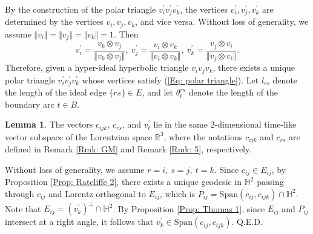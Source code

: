 \documentclass[12pt]{amsart}
\theoremstyle{definition}
\newtheorem{lemma}[theorem]{Lemma}
\def\qed{\hfill{Q.E.D.}\smallskip}
\begin{document}
By the construction of the polar triangle $v^\prime_iv^\prime_jv^\prime_k$,
the vertices $v^\prime_i, v^\prime_j, v^\prime_k$ are determined by the vertices $v_i, v_j, v_k$, and vice versa.
Without loss of generality, we assume $\Vert v_i\Vert =\Vert v_j\Vert =\Vert v_k\Vert =1$.
Then
\begin{equation}\label{Eq: polar triangle}
v^\prime_i=\frac{v_k\otimes v_j}{\Vert v_k\otimes v_j\Vert },\
v^\prime_j=\frac{v_i\otimes v_k}{\Vert v_i\otimes v_k\Vert },\
v^\prime_k=\frac{v_j\otimes v_i}{\Vert v_j\otimes v_i\Vert }.
\end{equation}
Therefore, given a hyper-ideal hyperbolic triangle $v_iv_jv_k$, there exists a unique polar triangle $v^\prime_iv^\prime_jv^\prime_k$ whose vertices satisfy (\ref{Eq: polar triangle}).
Let $l_{rs}$ denote the length of the ideal edge $\{rs\}\in E$, and let $\theta^{rs}_{t}$ denote the length of the boundary arc $t\in B$.

\begin{lemma}\label{Lem: coplaner}
The vectors $c_{ijk}$, $c_{rs}$, and $v^\prime_t$ lie in the same 2-dimensional time-like vector subspace of the Lorentzian space $\mathbb{R}^3$,
where the notations $c_{ijk}$ and $c_{rs}$ are defined in Remark \ref{Rmk: GM} and Remark \ref{Rmk: 5}, respectively. 
\end{lemma}
\proof
Without loss of generality, we assume $r=i,\ s=j,\ t=k$.
Since $c_{ij}\in E_{ij}$, by Proposition \ref{Prop: Ratcliffe 2},
there exists a unique geodesic in $\mathbb{H}^2$ passing through $c_{ij}$ and Lorentz orthogonal to $E_{ij}$, which is $P_{ij}=\textrm{Span}(c_{ij},c_{ijk})\cap\mathbb{H}^2$.
Note that $E_{ij}=(v^\prime_k)^\bot\cap\mathbb{H}^2$.
By Proposition \ref{Prop: Thomas 1},
since $E_{ij}$ and $P_{ij}$ intersect at a right angle, it follows that $v^\prime_k\in \textrm{Span}(c_{ij},c_{ijk})$.
\qed
\end{document}
